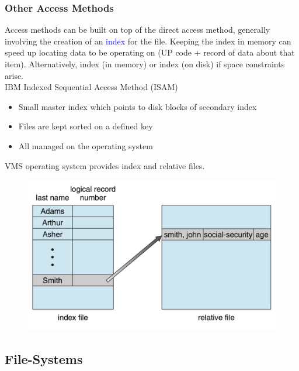 \documentclass{book/custombook}
\begin{document}
                \subsubsection{Other Access Methods}
                    Access methods can be built on top of the direct access method, generally involving the creation of 
                    an \textcolor{blue}{index} for the file. Keeping the index in memory can speed up locating data to be operating
                    on (UP code + record of data about that item). Alternatively, index (in memory) or index (on disk) if
                    space constraints arise.\\
                    IBM Indexed Sequential Access Method (ISAM)\\
                    \begin{itemize}
                        \item Small master index which points to disk blocks of secondary index
                        \item Files are kept sorted on a defined key
                        \item All managed on the operating system
                    \end{itemize}
                    VMS operating system provides index and relative files.
                    \begin{figure}
                        \centering
                        \includegraphics[width=0.6\linewidth]{figures/index_and_relative_files.png}
                    \end{figure}
            \subsection{File-Systems}
\end{document}
